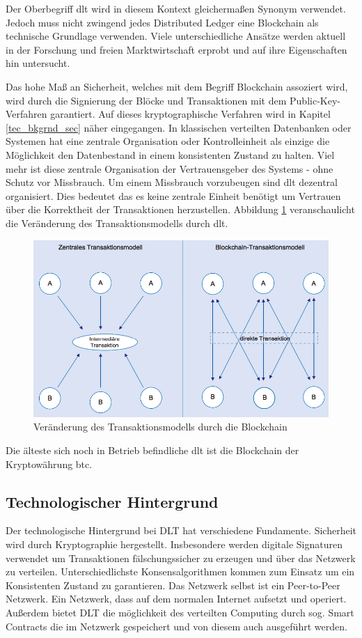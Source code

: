 Der Oberbegriff \acf{dlt} wird in diesem Kontext gleichermaßen Synonym verwendet. Jedoch muss nicht zwingend jedes \glqq Distributed Ledger\grqq{} eine Blockchain als technische Grundlage verwenden. Viele unterschiedliche Ansätze werden aktuell in der Forschung und freien Marktwirtschaft erprobt und auf ihre Eigenschaften hin untersucht.\cite[Vgl.]{Mitschele2018}

Das hohe Maß an Sicherheit, welches mit dem Begriff Blockchain assoziert wird, wird durch die Signierung der Blöcke und Transaktionen mit dem Public-Key-Verfahren garantiert. Auf dieses kryptographische Verfahren wird in Kapitel \ref{tec_bkgrnd_sec} näher eingegangen. In klassischen verteilten Datenbanken oder Systemen hat eine zentrale Organisation oder Kontrolleinheit als einzige die Möglichkeit den Datenbestand in einem konsistenten Zustand zu halten. Viel mehr ist diese zentrale Organisation der Vertrauensgeber des Systems - ohne Schutz vor Missbrauch. Um einem Missbrauch vorzubeugen sind \ac{dlt} dezentral organisiert. Dies bedeutet das es keine zentrale Einheit benötigt um Vertrauen über die Korrektheit der Transaktionen herzustellen.\cite[Vgl.]{Welzel2017} Abbildung \ref{fig:change-in-transaction-model-blockchain} veranschaulicht die Veränderung des Transaktionsmodells durch \ac{dlt}.
\begin{figure}[h!]
	\centering
    \includegraphics[width=0.76\linewidth]{pictures/change-in-transaction-model-blockchain}
	\caption[Veränderung des Transaktionsmodells durch die Blockchain]{Veränderung des Transaktionsmodells durch die Blockchain\cite{Kastrati2016}}
	\label{fig:change-in-transaction-model-blockchain}
\end{figure}

Die älteste sich noch in Betrieb befindliche \ac{dlt} ist die Blockchain der Kryptowährung \ac{btc}.

\subsection{Technologischer Hintergrund}
Der technologische Hintergrund bei DLT hat verschiedene Fundamente. Sicherheit wird durch Kryptographie hergestellt. Insbesondere werden digitale Signaturen verwendet um Transaktionen fälschungssicher zu erzeugen und über das Netzwerk zu verteilen. Unterschiedlichste Konsensalgorithmen kommen zum Einsatz um ein Konsistenten Zustand zu garantieren. Das Netzwerk selbst ist ein Peer-to-Peer Netzwerk. Ein Netzwerk, dass auf dem normalen Internet aufsetzt und operiert. Außerdem bietet DLT die möglichkeit des verteilten Computing durch sog. Smart Contracts die im Netzwerk gespeichert und von diesem auch ausgeführt werden.

